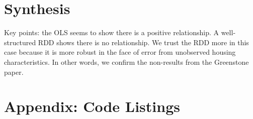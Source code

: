 \documentclass[letterpaper, 12pt]{article}
\begin{document}


\section{Synthesis}

Key points: the OLS seems to show there is a positive relationship.  A well-structured RDD shows there is no relationship.  We trust the RDD more in this case because it is more robust in the face of error from unobserved housing characteristics.  In other words, we confirm the non-results from the Greenstone paper.

\section{Appendix: Code Listings}



\end{document}
